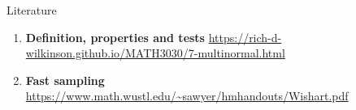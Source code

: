 \documentclass{beamer}
\begin{document}
\begin{frame}{Literature}
    \begin{enumerate}
        \item \textbf{Definition, properties and tests} \url{https://rich-d-wilkinson.github.io/MATH3030/7-multinormal.html}
        \item \textbf{Fast sampling} \url{https://www.math.wustl.edu/~sawyer/hmhandouts/Wishart.pdf}
    \end{enumerate}
\end{frame}
\end{document}

